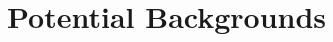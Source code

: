 \documentclass[11pt, a4paper]{article}
\def\ster{\ensuremath N}
\begin{document}
\section{Potential Backgrounds\label{app:bg}}
%
%
%
\end{document}
